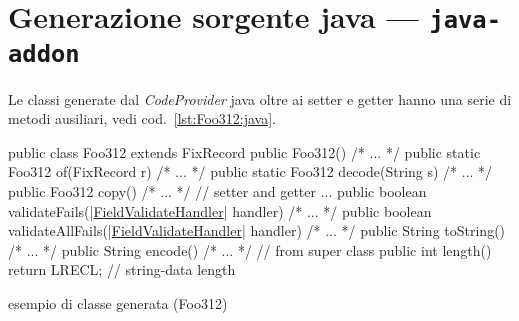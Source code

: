 \documentclass[a4paper,10pt]{report}
\newif\ifesource
\newenvironment{elisting}[1][H]
  {\captionsetup{aboveskip=0pt}\begin{listing}[#1]}
  {\end{listing}%
}
\begin{document}
\section{Generazione sorgente java --- \texttt{java-addon}} 
\label{sec:java.addon}
Le classi generate dal \textsl{CodeProvider} java oltre ai setter e getter
hanno una serie di metodi ausiliari, vedi cod.~\ref{lst:Foo312:java}.


\ifesource
\begin{figure*}[!htb]
\begin{lstlisting}[language=java, caption=esempio di classe generata (Foo312), 
label=lst:Foo312:java]
public class Foo312 extends FixRecord {
    public Foo312() { /* ... */ }
    public static Foo312 of(FixRecord r) { /* ... */ }
    public static Foo312 decode(String s) { /* ... */ }
    public Foo312 copy() { /* ... */ }
    // setter and getter ...
    public boolean validateFails((*\hyperref[lst:FieldValidateHandler:java]{FieldValidateHandler}*) handler) { /* ... */ }
    public boolean validateAllFails((*\hyperref[lst:FieldValidateHandler:java]{FieldValidateHandler}*) handler) { /* ... */ }
    public String toString() { /* ... */ }
    public String encode() { /* ... */ }    // from super class
    public int length() { return LRECL; }   // string-data length
}
\end{lstlisting}
\end{figure*}
\else
\begin{elisting}[!htb]
\begin{javacode}
public class Foo312 extends FixRecord {
    public Foo312() { /* ... */ }
    public static Foo312 of(FixRecord r) { /* ... */ }
    public static Foo312 decode(String s) { /* ... */ }
    public Foo312 copy() { /* ... */ }
    // setter and getter ...
    public boolean validateFails(|\hyperref[lst:FieldValidateHandler:java]{FieldValidateHandler}| handler) { /* ... */ }
    public boolean validateAllFails(|\hyperref[lst:FieldValidateHandler:java]{FieldValidateHandler}| handler) { /* ... */ }
    public String toString() { /* ... */ }
    public String encode() { /* ... */ }    // from super class
    public int length() { return LRECL; }   // string-data length
}
\end{javacode}
\caption{esempio di classe generata (Foo312)}
\label{lst:Foo312:java}
\end{elisting}
\fi
\end{document}
